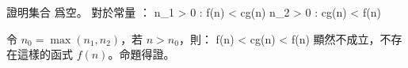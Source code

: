 \startEXERCISE
證明集合  爲空。
\stopEXERCISE
\startANSWER
對於常量 ：
\startsplitformula\startalign
\NC \exists n_1 > 0 :  \leq f(n) < cg(n) \NR
\NC \exists n_2 > 0 :  \leq cg(n) < f(n) \NR
\stopalign\stopsplitformula

令 $n_0 = \max(n_1,n_2)$，若 $n>n_0$，則：
\startformula
f(n) < cg(n) < f(n)
\stopformula
顯然不成立，不存在這樣的函式 $f(n)$。命題得證。
\stopANSWER
